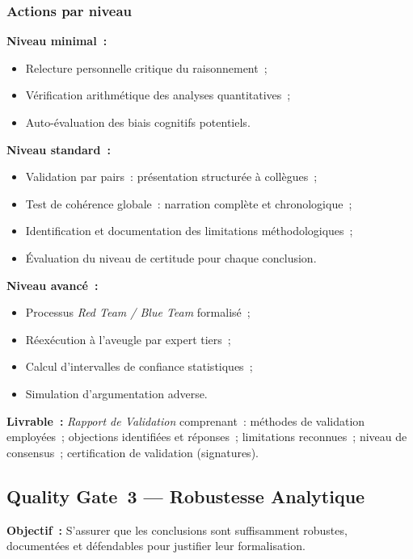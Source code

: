 \subsubsection*{Actions par niveau}

\textbf{Niveau minimal~:}
\begin{itemize}
    \item Relecture personnelle critique du raisonnement~;
    \item Vérification arithmétique des analyses quantitatives~;
    \item Auto-évaluation des biais cognitifs potentiels.
\end{itemize}

\textbf{Niveau standard~:}
\begin{itemize}
    \item Validation par pairs~: présentation structurée à collègues~;
    \item Test de cohérence globale~: narration complète et chronologique~;
    \item Identification et documentation des limitations méthodologiques~;
    \item Évaluation du niveau de certitude pour chaque conclusion.
\end{itemize}

\textbf{Niveau avancé~:}
\begin{itemize}
    \item Processus \textit{Red Team / Blue Team} formalisé~;
    \item Réexécution à l'aveugle par expert tiers~;
    \item Calcul d'intervalles de confiance statistiques~;
    \item Simulation d'argumentation adverse.
\end{itemize}

\textbf{Livrable~:} \textit{Rapport de Validation} comprenant~: méthodes de
validation employées~; objections identifiées et réponses~; limitations
reconnues~; niveau de consensus~; certification de validation (signatures).

\subsection{Quality Gate~3 --- Robustesse Analytique}

\textbf{Objectif~:} S'assurer que les conclusions sont suffisamment robustes,
documentées et défendables pour justifier leur formalisation.

